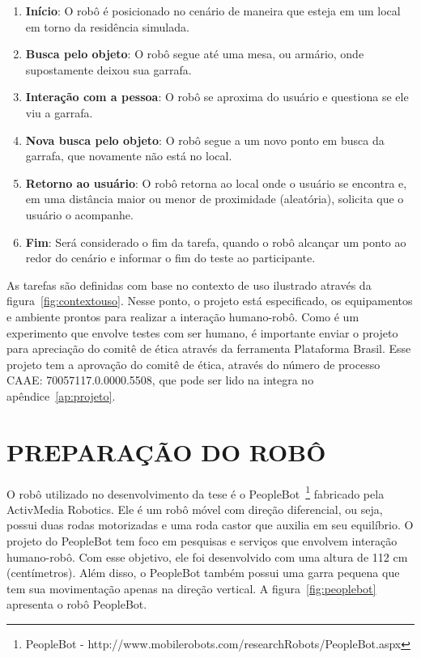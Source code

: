 \begin{enumerate}
	\item \textbf{Início}: O robô é posicionado no cenário de maneira que esteja em um local em torno da residência simulada.
	\item \textbf{Busca pelo objeto}: O robô segue até uma mesa, ou armário, onde supostamente deixou sua garrafa.
	\item \textbf{Interação com a pessoa}: O robô se aproxima do usuário e questiona se ele viu a garrafa.
	\item \textbf{Nova busca pelo objeto}: O robô segue a um novo ponto em busca da garrafa, que novamente não está no local.
	\item \textbf{Retorno ao usuário}: O robô retorna ao local onde o usuário se encontra e, em uma distância maior ou menor de proximidade (aleatória), solicita que o usuário o acompanhe.
	\item \textbf{Fim}: Será considerado o fim da tarefa, quando o robô alcançar um ponto ao redor do cenário e informar o fim do teste ao participante.
\end{enumerate}

As tarefas são definidas com base no contexto de uso ilustrado através da figura~\ref{fig:contextouso}. Nesse ponto, o projeto está especificado, os equipamentos e ambiente prontos para realizar a interação humano-robô. Como é um experimento que envolve testes com ser humano, é importante enviar o projeto para apreciação do comitê de ética através da ferramenta Plataforma Brasil. Esse projeto tem a aprovação do comitê de ética, através do número de processo CAAE: 70057117.0.0000.5508, que pode ser lido na integra no apêndice~\ref{ap:projeto}.

\section{PREPARAÇÃO DO ROBÔ}
\label{sec:ec_robo}
O robô utilizado no desenvolvimento da tese é o PeopleBot~\footnote{PeopleBot - http://www.mobilerobots.com/researchRobots/PeopleBot.aspx} fabricado pela ActivMedia Robotics. Ele é um robô móvel com direção diferencial, ou seja, possui duas rodas motorizadas e uma roda castor que auxilia em seu equilíbrio. O projeto do PeopleBot tem foco em pesquisas e serviços que envolvem interação humano-robô. Com esse objetivo, ele foi desenvolvido com uma altura de 112 cm (centímetros). Além disso, o PeopleBot também possui uma garra pequena que tem sua movimentação apenas na direção vertical. A figura~\ref{fig:peoplebot} apresenta o robô PeopleBot.

